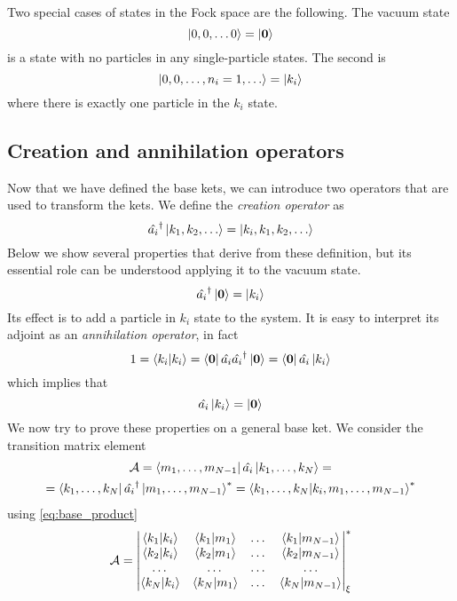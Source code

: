 Two special cases of states in the Fock space are the following. The vacuum state
\begin{equation}
    \ket{0,0,\dots0} = \ket{\mathbf{\boldsymbol{0}}}
\end{equation}
is a state with no particles in any single-particle states. The second is
\begin{equation}
    \ket{0,0,\dots, n_i = 1, \dots} = \ket{k_i}
\end{equation}
where there is exactly one particle in the $k_i$ state.

\subsection{Creation and annihilation operators}
Now that we have defined the base kets, we can introduce two operators that are used to transform the kets. We define the \emph{creation operator} as
\begin{equation} \label{eq:creation_definition}
    \hat{a_i}^\dagger \ket{k_1, k_2, \dots} = \ket{k_i,k_1, k_2, \dots}
\end{equation}
Below we show several properties that derive from these definition, but its essential role can be understood applying it to the vacuum state.
\begin{equation}
    \hat{a_i}^\dagger \ket{\mathbf{\boldsymbol{0}}} = \ket{k_i}
\end{equation}
Its effect is to add a particle in $k_i$ state to the system. It is easy to interpret its adjoint as an \emph{annihilation operator}, in fact
\begin{equation}
    1 = \braket{k_i}{k_i} = \bra{\mathbf{\boldsymbol{0}}}\hat{a_i}\hat{a_i}^\dagger\ket{\mathbf{\boldsymbol{0}}} = \bra{\mathbf{\boldsymbol{0}}}\hat{a_i}\ket{k_i}
\end{equation}
which implies that
\begin{equation}
    \hat{a_i}\ket{k_i} = \ket{\mathbf{\boldsymbol{0}}}
\end{equation}
We now try to prove these properties on a general base ket. We consider the transition matrix element
\begin{multline} \label{eq:annihilation_matrix}
    \mathcal{A} =  \bra{m_1, \dots, m_{N-1}} \hat{a_i} \ket{k_1, \dots, k_N} =
    \\ =  \bra{k_1, \dots, k_N} \hat{a_i}^\dagger \ket{m_1, \dots, m_{N-1}}^*
    = \bra{k_1, \dots, k_N} \ket{k_i, m_1, \dots, m_{N-1}}^*
\end{multline}
using \cref{eq:base_product}
\begin{equation}
    \mathcal{A} = \begin{vmatrix}
        \braket{k_1}{k_i} & \braket{k_1}{m_1} & \dots & \braket{k_1}{m_{N-1} } \\
        \braket{k_2}{k_i} & \braket{k_2}{m_1} & \dots & \braket{k_2}{m_{N-1}}  \\
        \dots             & \dots             & \dots & \dots                  \\
        \braket{k_N}{k_i} & \braket{k_N}{m_1} & \dots & \braket{k_N}{m_{N-1}}  \\
    \end{vmatrix}_\xi^*
\end{equation}
